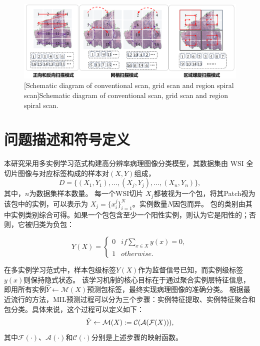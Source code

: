\begin{figure}[h]
  \centering
  \includegraphics[width=\columnwidth]{figures/多扫描模式.pdf}
  [Schematic diagram of conventional scan, grid scan and region spiral scan]{Schematic diagram of conventional scan, grid scan and region spiral scan.}
  \vspace{-10pt}
  \label{figure3: 扫描示意图}
  \end{figure}

\section[\hspace{-2pt}问题描述和符号定义]{{\heiti{} \hspace{-8pt}问题描述和符号定义}}\label{section3: 问题描述和符号定义}

本研究采用多实例学习范式构建高分辨率病理图像分类模型，其数据集由 WSI 全切片图像与对应标签构成的样本对$(X,Y)$组成，
\begin{equation}
  D=\{(X_1,Y_1),...,(X_j,Y_j),...,(X_n,Y_n)\},
\end{equation}
其中，$n$为数据集样本数量。
每一个WSI切片 $X_j$都被视为一个包，将其Patch视为该包中的实例，可以表示为 $X_j=\{x_i^j\}_{i=1}^N$。实例数量$N$因包而异。
包的类别由其中实例类别综合可得。如果一个包包含至少一个阳性实例，则认为它是阳性的；否则，它被归类为负包：

\begin{equation}
  Y(X)=\left \{
  \begin{array}{cl}
      0 &  if  \sum_{x \in X} y(x) = 0, \\
      1 & otherwise.
  \end{array}\right.
  \label{eq}
\end{equation}

在多实例学习范式中，样本包级标签$Y(X)$作为监督信号已知，而实例级标签$y(x)$则保持隐式状态。
该学习机制的核心目标在于通过聚合实例层特征信息，即用所有实例$\hat{Y}\gets\mathcal{M}\left(X\right)$预测包标签，最终实现病理图像的准确分类。
根据最近流行的方法，MIL预测过程可以分为三个步骤：实例特征提取、实例特征聚合和包分类。具体来说，这个过程可以定义如下：
\begin{equation}
  \hat{\mathnormal{Y}} \leftarrow \mathcal{M}(X):=\mathcal{C}(\mathcal{A}(\mathcal{F}(X))),
\label{eq1}
\end{equation}
其中$\mathcal{F}\left(\cdot\right)$、$\mathcal{A}\left(\cdot\right)$和$\mathcal{C}\left(\cdot\right)$分别是上述步骤的映射函数。

